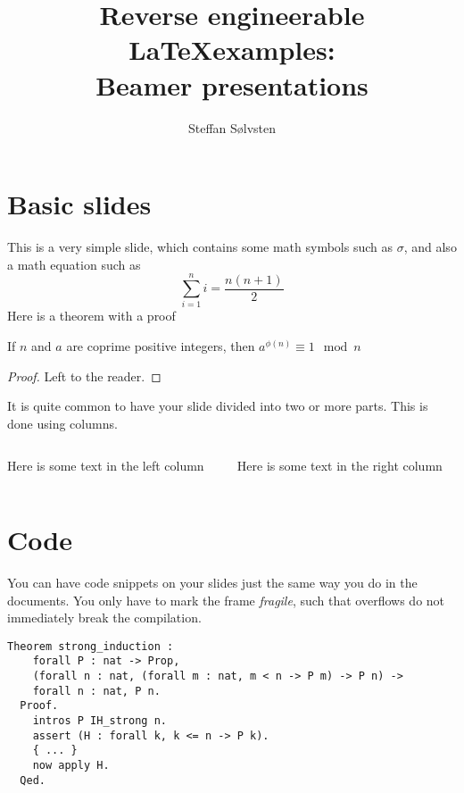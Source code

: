 \documentclass[english, aspectratio=169]{beamer}
\title[Alternate title]{
  {\small Reverse engineerable \LaTeX examples:} \\ {Beamer presentations}
}
\author{Steffan S\o lvsten}
\institute[AU] {
  Aarhus University
}
\begin{document}
\begin{frame}
  \titlepage
\end{frame}

\begin{frame}
  \tableofcontents
\end{frame}

\section{Basic slides}
\begin{frame}
  This is a very simple slide, which contains some math symbols such as
  $\sigma$, and also a math equation such as
  \begin{equation*}
    \sum_{i=1}^n i = \frac{n(n+1)}{2}
  \end{equation*}
  Here is a theorem with a proof

  \begin{theorem}[Euler]
    If $n$ and $a$ are coprime positive integers, then $a^{\phi(n)} \equiv 1
    \mod n$
  \end{theorem}
  \begin{proof}
    Left to the reader.
  \end{proof}
\end{frame}

\begin{frame}
  It is quite common to have your slide divided into two or more parts. This is
  done using columns.

  \begin{columns}
    \begin{column}{0.5\textwidth}
      Here is some text in the left column
    \end{column}
    \begin{column}{0.5\textwidth}
      Here is some text in the right column
    \end{column}
  \end{columns}
\end{frame}

\section{Code}
\begin{frame}[fragile]
  You can have code snippets on your slides just the same way you do in the
  documents. You only have to mark the frame \emph{fragile}, such that overflows
  do not immediately break the compilation.

  \begin{lstlisting}[language=coq, caption={Exercise on proving strong induction
      in \cite{SFDiscrete}}]
  Theorem strong_induction :
    forall P : nat -> Prop,
    (forall n : nat, (forall m : nat, m < n -> P m) -> P n) ->
    forall n : nat, P n.
  Proof.
    intros P IH_strong n.
    assert (H : forall k, k <= n -> P k).
    { ... }
    now apply H.
  Qed.
  \end{lstlisting}
\end{frame}
\end{document}

